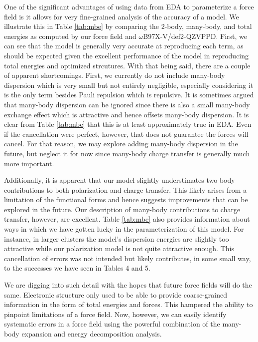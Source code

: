 \documentclass[12pt,letter]{article}
\begin{document}
One of the significant advantages of using data from EDA to parameterize a
force field is it allows for very fine-grained analysis of the accuracy of a model.
We illustrate this in Table \ref{tab:mbe} by comparing the 2-body, many-body, and total
energies as computed by our force field and $\omega$B97X-V/def2-QZVPPD. First, we can see
that the model is generally very accurate at reproducing each term, as should be expected
given the excellent performance of the model in reproducing total energies and optimized
strcutures. With that being said, there are a couple of apparent shortcomings. First,
we currently do not include many-body dispersion which is very small but not entirely
negligible, especially considering it is the only term besides Pauli repulsion which is
repulsive. It is sometimes argued that many-body dispersion can be ignored since there is
also a small many-body exchange effect which is attractive and hence offsets many-body
dispersion. It is clear from Table \ref{tab:mbe} that this is at least
approximately true in EDA. Even if the cancellation were perfect, however, that does
not guarantee the forces will cancel. For that reason, we may explore adding many-body
dispersion in the future, but neglect it for now since many-body charge transfer
is generally much more important.

Additionally, it is apparent that our model slightly understimates two-body contributions
to both polarization and charge transfer. This likely arises from a limitation of the
functional forms and hence suggests improvements that can be explored in the future.
Our description of many-body contributions to charge transfer, however, are excellent.
Table \ref{tab:mbe} also provides information about ways in which we have gotten lucky
in the parameterization of this model. For instance, in larger clusters the model's dispersion
energies are slightly too attractive while our polarization model is not quite attractive
enough. This cancellation of errors was not intended but likely contributes, in some small
way, to the successes we have seen in Tables 4 and 5.

We are digging into such detail with the hopes that future force fields will do the same.
Electronic structure only used to be able to provide coarse-grained information in the form
of total energies and forces. This hampered the ability to pinpoint limitations of a force field.
Now, however, we can easily identify systematic errors in a force field using the powerful
combination of the many-body expansion and energy decomposition analysis.
\end{document}
